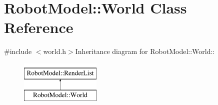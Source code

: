 \hypertarget{class_robot_model_1_1_world}{
\section{RobotModel::World Class Reference}
\label{class_robot_model_1_1_world}
}


{\ttfamily \#include $<$world.h$>$}Inheritance diagram for RobotModel::World::\begin{figure}[H]
\begin{center}
\leavevmode
\includegraphics[height=2cm]{class_robot_model_1_1_world}
\end{center}
\end{figure}
